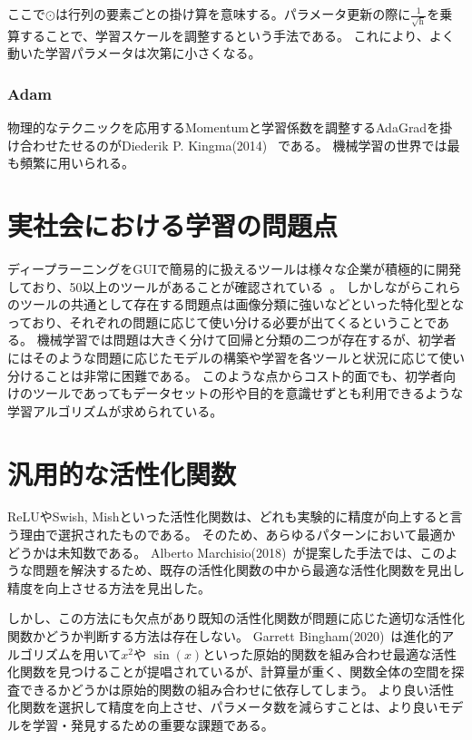 ここで$ \odot $は行列の要素ごとの掛け算を意味する。パラメータ更新の際に$ \frac{ 1 }{\sqrt{\mathrm{h}}} $を乗算することで、学習スケールを調整するという手法である。
これにより、よく動いた学習パラメータは次第に小さくなる。



\subsubsection{Adam}
物理的なテクニックを応用するMomentumと学習係数を調整するAdaGradを掛け合わせたせるのがDiederik P. Kingma(2014)~\cite{adam} である。
機械学習の世界では最も頻繁に用いられる。




\section{実社会における学習の問題点}

ディープラーニングをGUIで簡易的に扱えるツールは様々な企業が積極的に開発しており、50以上のツールがあることが確認されている~\cite{gui}。
しかしながらこれらのツールの共通として存在する問題点は画像分類に強いなどといった特化型となっており、それぞれの問題に応じて使い分ける必要が出てくるということである。
機械学習では問題は大きく分けて回帰と分類の二つが存在するが、初学者にはそのような問題に応じたモデルの構築や学習を各ツールと状況に応じて使い分けることは非常に困難である。
このような点からコスト的面でも、初学者向けのツールであってもデータセットの形や目的を意識せずとも利用できるような学習アルゴリズムが求められている。


\section{汎用的な活性化関数}

ReLUやSwish, Mishといった活性化関数は、どれも実験的に精度が向上すると言う理由で選択されたものである。
そのため、あらゆるパターンにおいて最適かどうかは未知数である。
Alberto Marchisio(2018)~\cite{automatic_af}が提案した手法では、このような問題を解決するため、既存の活性化関数の中から最適な活性化関数を見出し精度を向上させる方法を見出した。

しかし、この方法にも欠点があり既知の活性化関数が問題に応じた適切な活性化関数かどうか判断する方法は存在しない。
Garrett Bingham(2020)~\cite{evo_af}は進化的アルゴリズムを用いて$ x^2 $や $ \sin (x) $といった原始的関数を組み合わせ最適な活性化関数を見つけることが提唱されているが、計算量が重く、関数全体の空間を探査できるかどうかは原始的関数の組み合わせに依存してしまう。
より良い活性化関数を選択して精度を向上させ、パラメータ数を減らすことは、より良いモデルを学習・発見するための重要な課題である。



